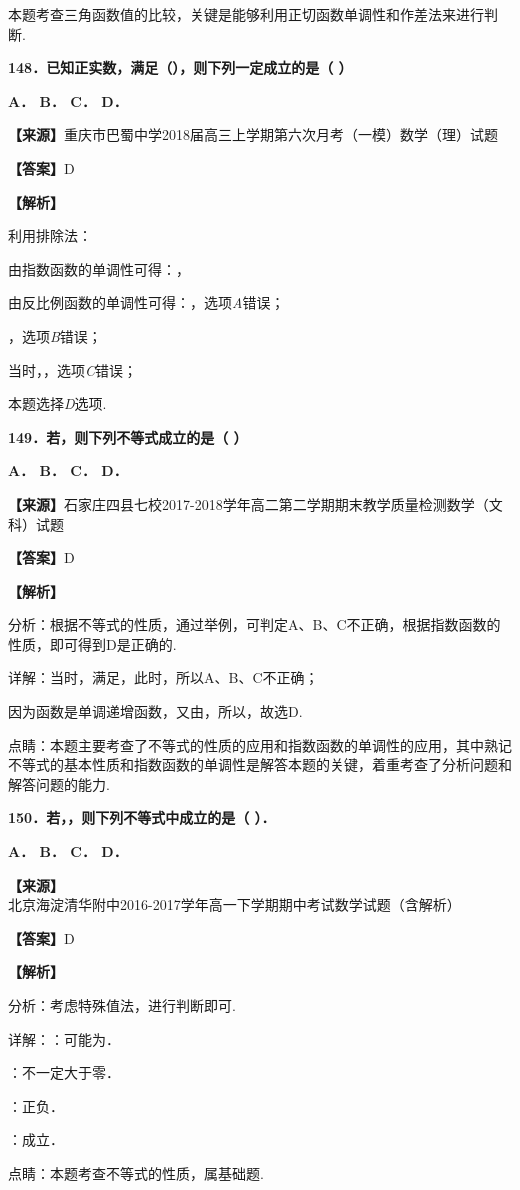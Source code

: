 本题考查三角函数值的比较，关键是能够利用正切函数单调性和作差法来进行判断.

\textbf{148．已知正实数，满足（），则下列一定成立的是（ ）}

\textbf{A． B． C． D．}

\textbf{【来源】}重庆市巴蜀中学2018届高三上学期第六次月考（一模）数学（理）试题

\textbf{【答案】}D

\textbf{【解析】}

利用排除法：

由指数函数的单调性可得：，

由反比例函数的单调性可得：，选项\emph{A}错误；

，选项\emph{B}错误；

当时，，选项\emph{C}错误；

本题选择\emph{D}选项.

\textbf{149．若，则下列不等式成立的是（ ）}

\textbf{A． B． C． D．}

\textbf{【来源】}石家庄四县七校2017-2018学年高二第二学期期末教学质量检测数学（文科）试题

\textbf{【答案】}D

\textbf{【解析】}

分析：根据不等式的性质，通过举例，可判定A、B、C不正确，根据指数函数的性质，即可得到D是正确的.

详解：当时，满足，此时，所以A、B、C不正确；

因为函数是单调递增函数，又由，所以，故选D.

点睛：本题主要考查了不等式的性质的应用和指数函数的单调性的应用，其中熟记不等式的基本性质和指数函数的单调性是解答本题的关键，着重考查了分析问题和解答问题的能力.

\textbf{150．若，，则下列不等式中成立的是（ ）．}

\textbf{A． B． C． D．}

\textbf{【来源】}北京海淀清华附中2016-2017学年高一下学期期中考试数学试题（含解析）

\textbf{【答案】}D

\textbf{【解析】}

分析：考虑特殊值法，进行判断即可.

详解：：可能为．

：不一定大于零．

：正负．

：成立．

点睛：本题考查不等式的性质，属基础题.


